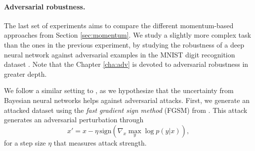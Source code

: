 \begin{table}[H]
\caption{Root Mean Squared Error results for the BNN experiments}\label{tab:bnn2}
\end{table}


\paragraph{Adversarial robustness.}

The last set of experiments aims to compare the different momentum-based approaches from Section \ref{sec:momentum}. We study a slightly more complex task than the ones in the previous experiment, by studying the robustness of a deep neural network against adversarial examples \parencite{goodfellow2014explaining} in the MNIST digit recognition dataset \parencite{MNIST}. Note that the Chapter \ref{cha:adv} is devoted to adversarial robustness in greater depth.

We follow a similar setting to \parencite{li2017dropout}, as we hypothesize that the uncertainty from Bayesian neural networks helps against adversarial attacks. First, we generate an attacked dataset using the \emph{fast gradient sign method} (FGSM) from \textcite{goodfellow2014explaining}. This attack generates an adversarial perturbation through
$$
x' = x - \eta\,\mbox{sign}(\nabla_x \max_y \log p(y|x)),
$$
for a step size $\eta$ that measures attack strength.

